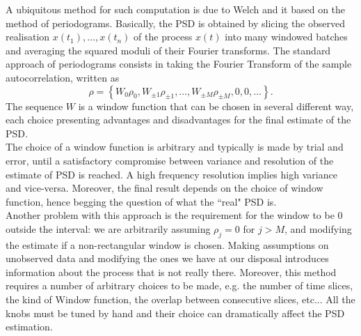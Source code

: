 \documentclass[twocolumn,showpacs,preprintnumbers,nofootinbib,prd,
superscriptaddress,10pt]{revtex4-1}
\begin{document}
A ubiquitous method for such computation is due to Welch \cite{Welch} and it based on the method of periodograms. Basically, the PSD is obtained by slicing the observed realisation $x(t_1),\ldots,x(t_n)$ of the process $x(t)$ into many windowed batches and averaging the squared moduli of their Fourier transforms. The standard approach of periodograms \cite{Lomb,Scargle} consists in taking the Fourier Transform of the sample autocorrelation, written as \begin{equation}
    \rho = \left\{W_0\rho_0,W_{\pm 1}\rho_{\pm 1}, \dots, W_{\pm M}\rho_{\pm M}, 0, 0, \dots \right\}.
\end{equation}
The sequence $W$ is a window function that can be chosen in several different way, each choice presenting advantages and disadvantages for the final estimate of the PSD. \\ 
The choice of a window function is arbitrary and typically is made by trial and error, until a satisfactory compromise between variance and resolution of the estimate of PSD is reached. A high frequency resolution implies high variance and vice-versa. Moreover, the final result depends on the choice of window function, hence begging the question of what the ``real" PSD is. \\  
Another problem with this approach is the requirement for the window to be $0$ outside the interval: we are arbitrarily assuming $\rho_j = 0$ for $j > M$, and modifying the estimate if a non-rectangular window is chosen. Making assumptions on unobserved data and modifying the ones we have at our disposal introduces information about the process that is not really there. Moreover, this method requires a number of arbitrary choices to be made, e.g. the number of time slices, the kind of Window function, the overlap between consecutive slices, etc... All the knobs must be tuned by hand and their choice can dramatically affect the PSD estimation.
\end{document}
